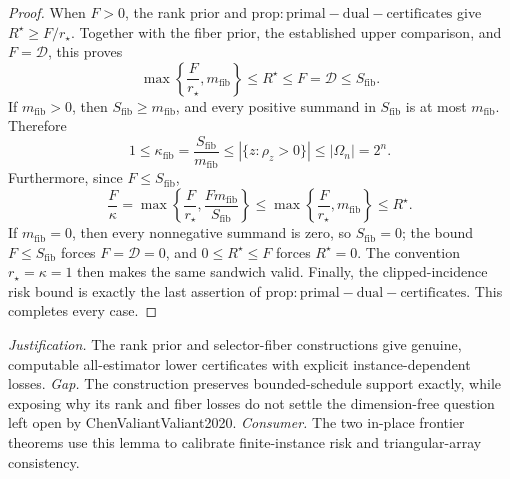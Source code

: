 \documentclass{article}
\begin{document}
\begin{proof}
When \(F>0\), the rank prior and \(\mathrm{prop:primal-dual-certificates}\) give \(R^{\star}\ge F/r_{\star}\). Together with the fiber prior, the established upper comparison, and \(F=\mathcal D\), this proves
\[
 \max\left\{\frac{F}{r_{\star}},m_{\mathrm{fib}}\right\}
 \le R^{\star}\le F=\mathcal D\le S_{\mathrm{fib}}.
\]
If \(m_{\mathrm{fib}}>0\), then \(S_{\mathrm{fib}}\ge m_{\mathrm{fib}}\), and every positive summand in \(S_{\mathrm{fib}}\) is at most \(m_{\mathrm{fib}}\). Therefore
\[
 1\le\kappa_{\mathrm{fib}}
 =\frac{S_{\mathrm{fib}}}{m_{\mathrm{fib}}}
 \le|\{z:\rho_z>0\}|\le|\Omega_n|=2^n.
\]
Furthermore, since \(F\le S_{\mathrm{fib}}\),
\[
 \frac{F}{\kappa}
 =\max\left\{\frac{F}{r_{\star}},
                 \frac{Fm_{\mathrm{fib}}}{S_{\mathrm{fib}}}\right\}
 \le\max\left\{\frac{F}{r_{\star}},m_{\mathrm{fib}}\right\}
 \le R^{\star}.
\]
If \(m_{\mathrm{fib}}=0\), then every nonnegative summand is zero, so \(S_{\mathrm{fib}}=0\); the bound \(F\le S_{\mathrm{fib}}\) forces \(F=\mathcal D=0\), and \(0\le R^{\star}\le F\) forces \(R^{\star}=0\). The convention \(r_{\star}=\kappa=1\) then makes the same sandwich valid. Finally, the clipped-incidence risk bound is exactly the last assertion of \(\mathrm{prop:primal-dual-certificates}\). This completes every case.
\end{proof}
\par\smallskip\noindent \textit{Justification.} The rank prior and selector-fiber constructions give genuine, computable all-estimator lower certificates with explicit instance-dependent losses. \textit{Gap.} The construction preserves bounded-schedule support exactly, while exposing why its rank and fiber losses do not settle the dimension-free question left open by ChenValiantValiant2020. \textit{Consumer.} The two in-place frontier theorems use this lemma to calibrate finite-instance risk and triangular-array consistency.
\end{document}
